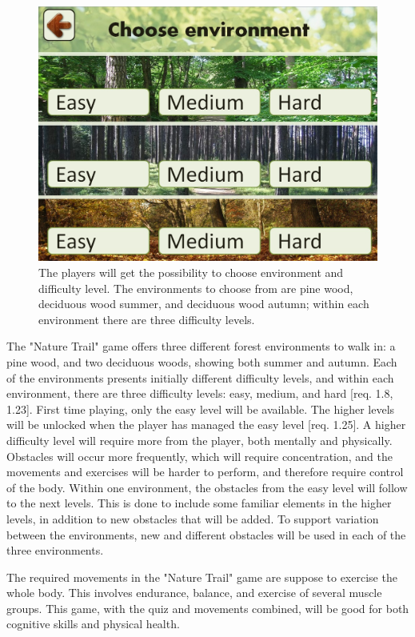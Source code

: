 \begin{figure} [H]
\centering
\includegraphics[scale=0.25]{chooseEnvironment.jpg}
\caption[Choice of environment and difficulty level]{The players will get the possibility to choose environment and difficulty level. The environments to choose from are pine wood, deciduous wood summer, and deciduous wood autumn; within each environment there are three difficulty levels.}
\label{fig:omgivelseNivaa}
\end{figure}

The "Nature Trail" game offers three different forest environments to walk in: a pine wood, and two deciduous woods, showing both summer and autumn. Each of the environments presents initially different difficulty levels, and within each environment, there are three difficulty levels: easy, medium, and hard [req. 1.8, 1.23]. First time playing, only the easy level will be available. The higher levels will be unlocked when the player has managed the easy level [req. 1.25]. A higher difficulty level will require more from the player, both mentally and physically. Obstacles will occur more frequently, which will require concentration, and the movements and exercises will be harder to perform, and therefore require control of the body. Within one environment, the obstacles from the easy level will follow to the next levels. This is done to include some familiar elements in the higher levels, in addition to new obstacles that will be added. To support variation between the environments, new and different obstacles will be used in each of the three environments.  

The required movements in the "Nature Trail" game are suppose to exercise the whole body. This involves endurance, balance, and exercise of several muscle groups. This game, with the quiz and movements combined, will be good for both cognitive skills and physical health.     

